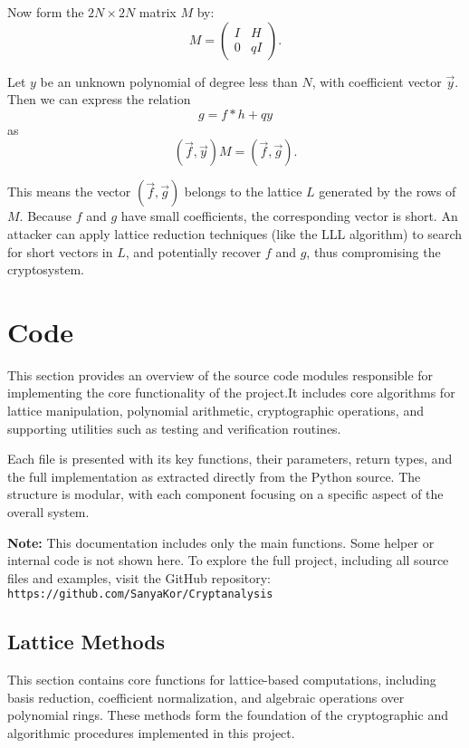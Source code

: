 \documentclass[a4paper,12pt]{article}
\begin{document}
Now form the \( 2N \times 2N \) matrix \( M \) by:
\[
M = 
\begin{pmatrix}
I & H \\
0 & qI
\end{pmatrix}.
\]

Let \( y \) be an unknown polynomial of degree less than \( N \), with coefficient vector \( \vec{y} \). Then we can express the relation
\[
g = f * h + qy
\]
as
\[
(\vec{f}, \vec{y}) M = (\vec{f}, \vec{g}).
\]

This means the vector \( (\vec{f}, \vec{g}) \) belongs to the lattice \( L \) generated by the rows of \( M \). Because \( f \) and \( g \) have small coefficients, the corresponding vector is short. An attacker can apply lattice reduction techniques (like the LLL algorithm) to search for short vectors in \( L \), and potentially recover \( f \) and \( g \), thus compromising the cryptosystem.

\newpage
\section{Code}
This section provides an overview of the source code modules responsible for implementing the core functionality of the project.It includes core algorithms for lattice manipulation, polynomial arithmetic, cryptographic operations,  
and supporting utilities such as testing and verification routines.

Each file is presented with its key functions, their parameters, return types, and the full implementation  
as extracted directly from the Python source. The structure is modular, with each component focusing on  
a specific aspect of the overall system.

\vspace{1em}
\noindent
\textbf{Note:} This documentation includes only the main functions.  
Some helper or internal code is not shown here.  
To explore the full project, including all source files and examples, visit the GitHub repository:  
\texttt{https://github.com/SanyaKor/Cryptanalysis}

\subsection{Lattice Methods}
This section contains core functions for lattice-based computations, including basis reduction,  
coefficient normalization, and algebraic operations over polynomial rings.  
These methods form the foundation of the cryptographic and algorithmic procedures implemented in this project.
\end{document}
